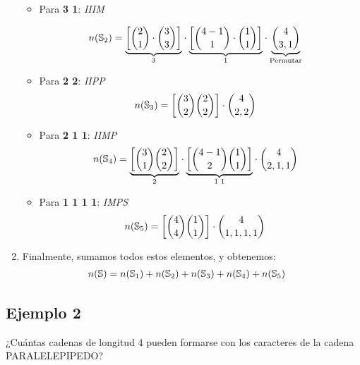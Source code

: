 \begin{enumerate}
\begin{itemize}
\item Para \textbf{3 1}: \textit{IIIM}

\begin{align*}
n(\mathbb{S}_2)&=\underset{3}{\underbrace{\left[\binom{2}{1}\cdot\binom{3}{3}\right]}}\cdot\underset{1}{\underbrace{\left[\binom{4-1}{1}\cdot\binom{1}{1}\right]}}\cdot\underset{\text{Permutar}}{\underbrace{\binom{4}{3,1}}}
\end{align*}

\item Para \textbf{2 2}:
\textit{IIPP}
\begin{align*}
n(\mathbb{S}_3)&=\left[\binom{3}{2}\binom{2}{2}\right]\cdot\binom{4}{2,2}
\end{align*}

\item Para \textbf{2 1 1}:
\textit{IIMP}
\begin{align*}
n(\mathbb{S}_4)&=\underset{\text{2}}{\underbrace{\left[\binom{3}{1}\binom{2}{2}\right]}}\cdot\underset{\text{1 1}}{\underbrace{\left[\binom{4-1}{2}\binom{1}{1}\right]}}\cdot\binom{4}{2,1,1}
\end{align*}
\item Para \textbf{1 1 1 1}:
\textit{IMPS}
\begin{align*}
n(\mathbb{S}_5)&=\left[\binom{4}{4}\binom{1}{1}\right]\cdot\binom{4}{1,1,1,1}
\end{align*}
\end{itemize}
\item Finalmente, sumamos todos estos elementos, y obtenemos:
\begin{align*}
n(\mathbb{S})&=n(\mathbb{S}_1)+n(\mathbb{S}_2)+n(\mathbb{S}_3)+n(\mathbb{S}_4)+n(\mathbb{S}_5)
\end{align*}
\end{enumerate}

\subsection*{Ejemplo 2}
¿Cuántas cadenas de longitud 4 pueden formarse con los caracteres de la cadena PARALELEPIPEDO?

